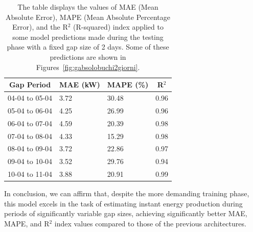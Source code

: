 \begin{table}[H]
	\begin{center}
		\begin{tabular}[c]{l|l|l|l}
			\multicolumn{1}{c|}{\textbf{Gap Period}} &
			\multicolumn{1}{c|}{\textbf{MAE (kW)}}   &
			\multicolumn{1}{c|}{\textbf{MAPE (\%)}}  &                     %
			\multicolumn{1}{c}{\textbf{R}$^2$}                             \\
			\hline

			04-04 to 05-04                           & 3.72 & 30.48 & 0.96 \\
			05-04 to 06-04                           & 4.25 & 26.99 & 0.96 \\
			06-04 to 07-04                           & 4.59 & 20.39 & 0.98 \\
			07-04 to 08-04                           & 4.33 & 15.29 & 0.98 \\
			08-04 to 09-04                           & 3.72 & 22.86 & 0.97 \\
			09-04 to 10-04                           & 3.52 & 29.76 & 0.94 \\
			10-04 to 11-04                           & 3.88 & 20.91 & 0.99

		\end{tabular}
	\end{center}
	\caption{The table displays the values of MAE (Mean Absolute Error), MAPE (Mean Absolute Percentage Error), and the R$^2$ (R-squared) index applied to some model predictions made during the testing phase with a fixed gap size of 2 days. Some of these predictions are shown in Figures~\ref{fig:gabsolobuchi2giorni}.}
\end{table}

In conclusion, we can affirm that, despite the more demanding training phase, this model excels in the task of estimating instant energy production during periods of significantly variable gap sizes, achieving significantly better MAE, MAPE, and R$^2$ index values compared to those of the previous architectures.

%

